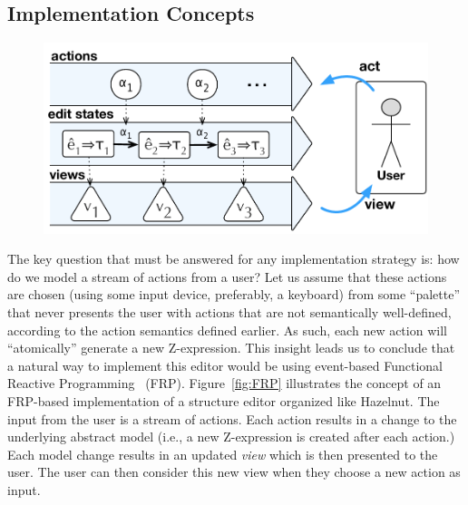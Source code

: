 \subsection{Implementation Concepts}

\begin{figure}
\centering
\includegraphics[width=0.90\columnwidth]{impl-overview}
\caption{}
\label{fig:impl-overview}
\end{figure}











The key question that must be answered for any implementation strategy is: how do we model a stream of actions from a user? Let us assume that these actions are chosen (using some input device, preferably, a keyboard) from some ``palette'' that never presents the user with actions that are not semantically well-defined, according to the action semantics defined earlier.
As such, each new action will ``atomically'' generate a new Z-expression. 
This insight leads us to conclude that a natural way to implement this editor would be using event-based Functional Reactive Programming~\cite{Wan:2000:FRP:349299.349331} (FRP).
Figure~\ref{fig:FRP} illustrates the concept of an FRP-based implementation of a  structure editor organized like Hazelnut.
The input from the user is a stream of actions.  Each action results in a change to the underlying abstract model (i.e., a new Z-expression is created after each action.)
Each model change results in an updated \emph{view} which is then presented to the user.  The user can then consider this new view when they choose a new action as input.


